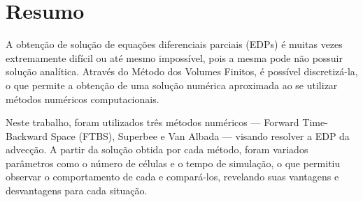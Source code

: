 \chapter{Resumo}

A obtenção de solução de equações diferenciais parciais (EDPs) é muitas vezes
extremamente difícil ou até mesmo impossível, pois a mesma pode não possuir
solução analítica. Através do Método dos Volumes Finitos, é possível
discretizá-la, o que permite a obtenção de uma solução numérica aproximada ao
se utilizar métodos numéricos computacionais.

Neste trabalho, foram utilizados três métodos numéricos --- Forward
Time-Backward Space (FTBS), Superbee e Van Albada --- visando resolver a EDP da
advecção. A partir da solução obtida por cada método, foram variados parâmetros
como o número de células e o tempo de simulação, o que permitiu observar o
comportamento de cada e compará-los, revelando suas vantagens e desvantagens
para cada situação.